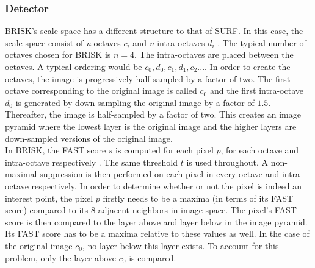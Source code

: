 \documentclass[11pt]{report}
\begin{document}
%

\subsubsection{Detector}
\label{briskDetect}
BRISK's scale space has a different structure to that of SURF. In this case, the scale space consist of \textit{n} octaves \textit{$c_i$} and \textit{n} intra-octaves \textit{$d_i$} \cite{Leutenegger2011}. The typical number of octaves chosen for BRISK is $n=4$. The intra-octaves are placed between the octaves. A typical ordering would be $c_0, d_0, c_1, d_1, c_2...$. In order to create the octaves, the image is progressively half-sampled by a factor of two. The first octave corresponding to the original image is called $c_0$ and the first intra-octave $d_0$ is generated by down-sampling the original image by a factor of $1.5$. Thereafter, the image is half-sampled by a factor of two. This creates an image pyramid where the lowest layer is the original image and the higher layers are down-sampled versions of the original image.\\

In BRISK, the FAST score $s$ is computed for each pixel $p$, for each octave and intra-octave respectively \cite{Leutenegger2011}. The same threshold $t$ is used throughout. A non-maximal suppression is then performed on each pixel in every octave and intra-octave respectively. In order to determine whether or not the pixel is indeed an interest point, the pixel $p$ firstly needs to be a maxima (in terms of its FAST score) compared to its $8$ adjacent neighbors in image space. The pixel's FAST score is then compared to the layer above and layer below in the image pyramid. Its FAST score has to be a maxima relative to these values as well. In the case of the original image $c_0$, no layer below this layer exists. To account for this problem, only the layer above $c_0$ is compared.\\
\end{document}
